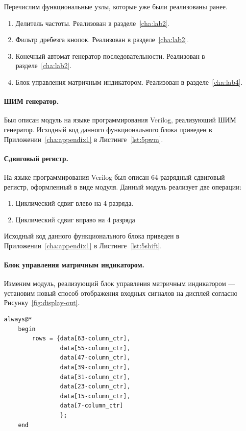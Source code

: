 Перечислим функциональные узлы, которые уже были реализованы ранее. 

\begin{enumerate}
	\item Делитель частоты. Реализован в разделе~\ref{cha:lab2}.
	\item Фильтр дребезга кнопок. Реализован в разделе~\ref{cha:lab2}.
	\item Конечный автомат генератор последовательности. Реализован в разделе~\ref{cha:lab2}.
	\item Блок управления матричным индикатором. Реализован в разделе~\ref{cha:lab4}.
\end{enumerate}

\paragraph{ШИМ генератор.}
Был описан модуль на языке программирования Verilog, реализующий ШИМ генератор. 
Исходный код данного функционального блока приведен в Приложении~\ref{cha:appendix1} в Листинге~\ref{lst:5pwm}.


\paragraph{Сдвиговый регистр.}
На языке программирования Verilog был описан 64-разрядный сдвиговый регистр, оформленный в виде модуля. Данный модуль реализует две операции:
\begin{enumerate}
	\item Циклический сдвиг влево на 4 разряда.
	\item Циклический сдвиг вправо на 4 разряда
\end{enumerate}

Исходный код данного функционального блока приведен в Приложении~\ref{cha:appendix1} в Листинге~\ref{lst:5shift}.

\paragraph{Блок управления матричным индикатором.}
Изменим модуль, реализующий блок управления матричным индикатором --- установим новый способ отображения входных сигналов на дисплей согласно Рисунку~\ref{fig:display-out}.

\begin{lstlisting}[caption={Измененный способ коммутации}]
	always@*
	begin
		rows = {data[63-column_ctr],
				data[55-column_ctr],
				data[47-column_ctr],
				data[39-column_ctr],
				data[31-column_ctr],
				data[23-column_ctr],
				data[15-column_ctr],
				data[7-column_ctr]
				};
	end
\end{lstlisting}

